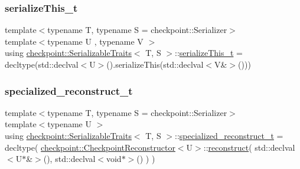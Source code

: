 \subsubsection{\texorpdfstring{serialize\+This\+\_\+t}{serializeThis\_t}}
{\footnotesize\ttfamily template$<$typename T, typename S = checkpoint\+::\+Serializer$>$ \\
template$<$typename U , typename V $>$ \\
using \hyperlink{structcheckpoint_1_1_serializable_traits}{checkpoint\+::\+Serializable\+Traits}$<$ T, S $>$\+::\hyperlink{structcheckpoint_1_1_serializable_traits_ac81eb64532a65d97dc995e582ef708ad}{serialize\+This\+\_\+t} =  decltype(std\+::declval$<$U$>$().serialize\+This(std\+::declval$<$V\&$>$()))}

\mbox{\label{structcheckpoint_1_1_serializable_traits_a914c73251ad840e5370f1ac7cb1c18de}} 
\subsubsection{\texorpdfstring{specialized\+\_\+reconstruct\+\_\+t}{specialized\_reconstruct\_t}}
{\footnotesize\ttfamily template$<$typename T, typename S = checkpoint\+::\+Serializer$>$ \\
template$<$typename U $>$ \\
using \hyperlink{structcheckpoint_1_1_serializable_traits}{checkpoint\+::\+Serializable\+Traits}$<$ T, S $>$\+::\hyperlink{structcheckpoint_1_1_serializable_traits_a914c73251ad840e5370f1ac7cb1c18de}{specialized\+\_\+reconstruct\+\_\+t} =  decltype( \hyperlink{structcheckpoint_1_1_checkpoint_reconstructor}{checkpoint\+::\+Checkpoint\+Reconstructor}$<$U$>$\+::\hyperlink{namespacecheckpoint_a6254f2e220f905a2b0c797c08092a7a1}{reconstruct}( std\+::declval$<$U$\ast$\&$>$(), std\+::declval$<$void$\ast$$>$() ) )}

\mbox{\label{structcheckpoint_1_1_serializable_traits_a5a1f289a5008468335f22e288a96d861}} 

